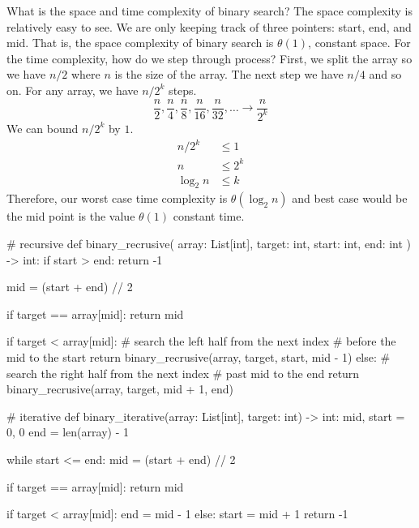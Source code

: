 \documentclass[12pt,dvipsnames,svgnames,x11names]{article}
\begin{document}
What is the space and time complexity of binary search? The space complexity is relatively easy to see. 
We are only keeping track of three pointers: start, end, and mid. That is, the space complexity of binary
search is \(\theta(1)\), constant space. For the time complexity, how do we step through process? First, 
we split the array so we have \(n / 2\) where \(n\) is the size of the array. The next step we have \(n / 4\)
and so on. For any array, we have \(n / 2^k\) steps.
\[
	\frac{n}{2}, \frac{n}{4}, \frac{n}{8}, \frac{n}{16}, \frac{n}{32}, \ldots\rightarrow \frac{n}{2^k}
\]
We can bound \(n / 2^k\) by \(1\).
\begin{align*}
	n / 2^k & \leq 1\\
	n & \leq 2^k \\
	\log_2 n & \leq k
\end{align*}
Therefore, our worst case time complexity is \(\theta(\log_2 n)\) and best case would be the mid point is
the value \(\theta(1)\) constant time.
\begin{python}
# recursive
def binary_recrusive(
		array: List[int], 
		target: int, 
		start: int, 
		end: int
		) -> int:
  if start > end:
    return -1
		
  mid = (start + end) // 2
	
  if target == array[mid]:
	return mid
		
  if target < array[mid]:
	# search the left half from the next index 
	# before the mid to the start
	return binary_recrusive(array, target, start, mid - 1)
  else:
	# search the right half from the next index 
	# past mid to the end
	return binary_recrusive(array, target, mid + 1, end)
	
	
# iterative
def binary_iterative(array: List[int], target: int) -> int:
  mid, start = 0, 0
  end = len(array) - 1
  
  while start <= end:
    mid = (start + end) // 2
    
    if target == array[mid]:
      return mid
      
    if target < array[mid]:
      end = mid - 1
    else:
      start = mid + 1
  return -1
\end{python}
\end{document}
